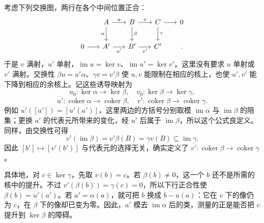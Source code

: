 \ProseParagraphBreak
考虑下列交换图，两行在各个中间位置正合：
\begin{equation}\label{b2:eq:snake-diagram}
	\begin{tikzcd}[column sep=1.7em,row sep=2em]
		{}&A\arrow[r,"u"]\arrow[d,"\alpha"']&B\arrow[r,"v"]\arrow[d,"\beta"]&C\arrow[r]\arrow[d,"\gamma"]&0\\
		0\arrow[r]&A'\arrow[r,"u'"']&B'\arrow[r,"v'"']&C'&{}.
	\end{tikzcd}
\end{equation}
于是 \(v\) 满射，\(u'\) 单射，\(\operatorname{im}u=\ker v\)、\(\operatorname{im}u'=\ker v'\)。这里没有要求 \(u\) 单射或 \(v'\) 满射。交换性 \(\beta u=u'\alpha\)、\(\gamma v=v'\beta\) 使 \(u,v\) 能限制在相应的核上，也使 \(u',v'\) 能下降到相应的余核上。记这些诱导映射为
\[
	u_0:\ker\alpha\longrightarrow\ker\beta,\quad v_0:\ker\beta\longrightarrow\ker\gamma,
\]
\[
	\overline{u'}:\operatorname{coker}\alpha\longrightarrow\operatorname{coker}\beta, \quad \overline{v'}:\operatorname{coker}\beta\longrightarrow\operatorname{coker}\gamma.
\]
例如 \(\overline{u'}([a'])=[u'(a')]\)，这里两边的方括号分别取模 \(\operatorname{im}\alpha\) 与 \(\operatorname{im}\beta\) 的陪集；更换 \(a'\) 的代表元所带来的变化，经 \(u'\) 后属于 \(\operatorname{im}\beta\)，所以这个公式良定义。同样，由交换性可得
\[
	v'(\operatorname{im}\beta)=v'\beta(B)=\gamma v(B) \subseteq\operatorname{im}\gamma.
\]
因此 \([b']\mapsto[v'(b')]\) 与代表元的选择无关，确实定义了 \(\overline{v'}:\operatorname{coker}\beta\to\operatorname{coker}\gamma\)。

\ProseParagraphBreak
具体地，对 \(c\in\ker\gamma\)，先取 \(v(b)=c\)。若 \(\beta(b)\ne0\)，这一个 \(b\) 还不是所需的核中的提升。不过 \(v'(\beta(b))=\gamma(c)=0\)，所以下行正合性使 \(\beta(b)=u'(a')\)。若 \(a'=\alpha(a)\)，就可把 \(b\) 换成 \(b-u(a)\)：它在 \(v\) 下的像仍为 \(c\)，在 \(\beta\) 下的像却已变为零。因此，\(a'\) 模去 \(\operatorname{im}\alpha\) 后的类，测量的正是能否把 \(c\) 提升到 \(\ker\beta\) 的障碍。

